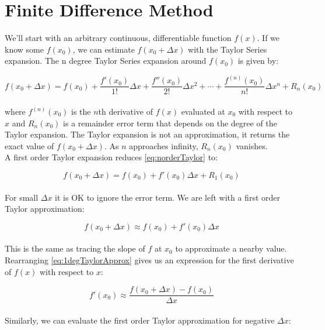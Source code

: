 {\section{Finite Difference Method}

We'll start with an arbitrary continuous, differentiable function $f(x)$.  If we know some $f(x_{0})$, we can estimate $f(x_{0}+\Delta  x)$ with the Taylor Series expansion.  The n degree Taylor Series expansion around $f(x_{0})$ is given by:

 \begin{equation}\label{eq:norderTaylor}
  f(x_{0} + \Delta  x) = f(x_{0}) + \frac{f'(x_{0})}{1!}\Delta  x + \frac{f''(x_{0})}{2!}\Delta  x^{2} + \cdots  + \frac{f^{(n)}(x_{0})}{n!}\Delta  x^{n} + R_{n}(x_{0})
  \end{equation}
    \\
  where $f^{(n)}(x_{0})$ is the $n$th derivative of $f(x)$ evaluated at $x_{0}$ with respect to $x$ and $R_{n}(x_{0})$ is a remainder error term that depends on the degree of the Taylor expansion.  The Taylor expansion is not an approximation, it returns the exact value of $ f(x_{0} + \Delta  x)$.  As $n$ approaches infinity, $R_{n}(x_{0})$ vanishes.\\
  

A first order Taylor expansion reduces \ref{eq:norderTaylor} to:
  
 \begin{equation}\label{eq:1degTaylor}
  f(x_{0} + \Delta  x) = f(x_{0}) + f'(x_{0})\Delta x + R_{1}(x_{0})
  \end{equation}
    \\
  For small $\Delta  x$ it is OK to ignore the error term.  We are left with a first order Taylor approximation:
  
   \begin{equation}\label{eq:1degTaylorApprox}
  f(x_{0} + \Delta  x) \approx f(x_{0}) + f'(x_{0})\Delta x
  \end{equation}
    \\
This is the same as tracing the slope of $f$ at $x_{0}$ to approximate a nearby value.  Rearranging \ref{eq:1degTaylorApprox} gives us an expression for the first derivative of $f(x)$ with respect to $x$:

 \begin{equation}\label{eq:fdaForward}
 f'(x_{0}) \approx \frac{f(x_{0} + \Delta  x) - f(x_{0})}{\Delta  x}
  \end{equation}
    \\
Similarly, we can evaluate the first order Taylor approximation for negative $\Delta x$:

}
